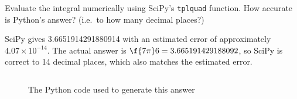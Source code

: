 \documentclass[a4paper]{article}
\begin{document}
\begin{questionbody}
Evaluate the integral numerically using SciPy’s \texttt{tplquad} function. How accurate is Python’s answer? (i.e.\ to how many decimal places?)
\end{questionbody}

SciPy gives 3.6651914291880914 with an estimated error of approximately $4.07 \times 10^{-14}$. The actual answer is $\f{7\pi}6 = 3.665191429188092$, so SciPy is correct to 14 decimal places, which also matches the estimated error.

\begin{figure}[h]
    \centering
    \inputminted{python}{./code/Q3.py}
    \caption{The Python code used to generate this answer}
\end{figure}
\end{document}
